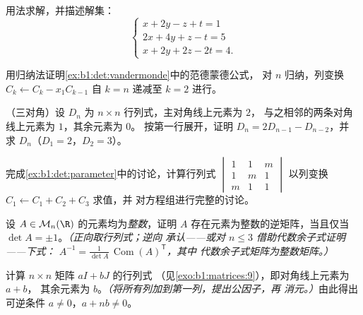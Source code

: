 \begin{exercise}[$\star$]\label{exo:b1:det:4}
用法求解，并描述解集：
\[
\begin{cases}
x + 2y - z + t = 1\\
2x + 4y + z - t = 5\\
x + 2y + 2z - 2t = 4 .
\end{cases}
\]
\end{exercise}

\begin{exercise}[$\star\star$]\label{exo:b1:det:5}
用归纳法证明\cref{ex:b1:det:vandermonde}中的范德蒙德公式，
对 $n$ 归纳，列变换 $C_k \leftarrow C_k -
x_1 C_{k-1}$ 自 $k = n$ 递减至 $k = 2$ 进行。
\end{exercise}

\begin{exercise}[$\star\star$]\label{exo:b1:det:6}
（三对角）设 $D_n$ 为 $n \times n$ 行列式，主对角线上元素为 $2$，
与之相邻的两条对角线上元素为 $1$，其余元素为 $0$。
按第一行展开，证明 $D_n = 2D_{n-1} - D_{n-2}$，并
求 $D_n$（$D_1 = 2$，$D_2 = 3$）。
\end{exercise}

\begin{exercise}[$\star\star$]\label{exo:b1:det:7}
完成\cref{ex:b1:det:parameter}中的讨论，计算行列式
$\begin{vmatrix} 1 & 1 & m\\ 1 & m & 1\\ m & 1 & 1\end{vmatrix}$
以列变换 $C_1 \leftarrow C_1 + C_2 + C_3$ 求值，并
对方程组进行完整的讨论。
\end{exercise}

\begin{exercise}[$\star\star$]\label{exo:b1:det:8}
设 $A \in \mathcal{M}_n(\R)$ 的元素均为\emph{整数}，证明
$A$ 存在元素为整数的逆矩阵，当且仅当 $\det A
= \pm 1$。\emph{（正向取行列式；逆向
承认——或对 $n \leq 3$ 借助代数余子式证明——下式：
$A^{-1} = \frac{1}{\det A}\,\operatorname{Com}(A)^{\mathsf T}$，其中
代数余子式矩阵为整数矩阵。）}
\end{exercise}

\begin{exercise}[$\star\star\star$]\label{exo:b1:det:9}
计算 $n \times n$ 矩阵 $aI + bJ$ 的行列式
（见\cref{exo:b1:matrices:9}），即对角线上元素为 $a + b$，
其余元素为 $b$。\emph{（将所有列加到第一列，提出公因子，再
消元。）}由此得出可逆条件 $a \neq 0$，$a + nb
\neq 0$。
\end{exercise}

